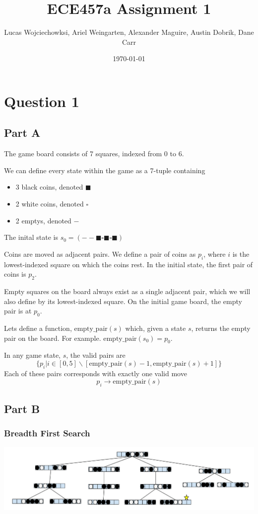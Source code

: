 \documentclass[a4paper]{article}
\title{ECE457a Assignment 1}
\author{Lucas Wojciechowksi, Ariel Weingarten, Alexander Maguire, Austin Dobrik, Dane Carr}
\date{\today}
\newcommand{\coinblack}{\blacksquare}
\newcommand{\coinwhite}{\square}
\newcommand{\coinempty}{-}
\begin{document}
\maketitle

\section{Question 1}

\subsection{Part A}

The game board consists of 7 squares, indexed from 0 to 6.

We can define every state within the game as a 7-tuple containing
\begin{itemize}
\item 3 black coins, denoted $\coinblack$
\item 2 white coins, denoted $\coinwhite$
\item 2 emptys, denoted $\coinempty$
\end{itemize}
The inital state is $s_0 = (\coinempty \coinempty \coinblack \coinwhite \coinblack \coinwhite \coinblack)$

Coins are moved as adjacent pairs. We define a pair of coins as $p_i$, where $i$ is the lowest-indexed square on which the coins rest. In the initial state, the first pair of coins is $p_2$.

Empty squares on the board always exist as a single adjacent pair, which we will also define by its lowest-indexed square. On the initial game board, the empty pair is at $p_0$.

Lets define a function, $\text{empty\_pair}(s)$ which, given a state $s$, returns the empty pair on the board. For example. $\text{empty\_pair}(s_0) = p_0$.

In any game state, $s$, the valid pairs are
$$\{p_i | i \in [0, 5] \backslash [\text{empty\_pair}(s) - 1, \text{empty\_pair}(s) + 1]\}$$
Each of these pairs corresponds with exactly one valid move
$$p_i \rightarrow \text{empty\_pair}(s)$$



\subsection{Part B}

\subsubsection{Breadth First Search}
\begin{center}
\includegraphics[width=1\textwidth]{BFS.png}
\end{center}
\end{document}
